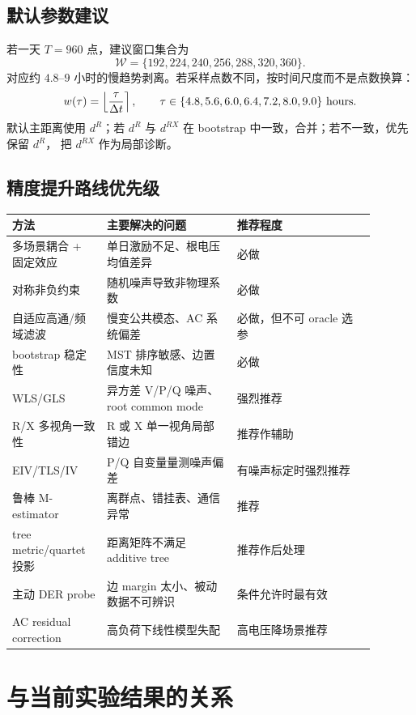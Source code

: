 \documentclass[UTF8,11pt]{ctexart}
\begin{document}
\subsection{默认参数建议}

若一天 $T=960$ 点，建议窗口集合为
\[
    \mathcal{W}=\{192,224,240,256,288,320,360\}.
\]
对应约 $4.8$--$9$ 小时的慢趋势剥离。若采样点数不同，按时间尺度而不是点数换算：
\[
    w(\tau)=\left\lfloor\frac{\tau}{\Delta t}\right\rceil,\qquad
    \tau\in\{4.8,5.6,6.0,6.4,7.2,8.0,9.0\}\ {\rm hours}.
\]
默认主距离使用 $d^R$；若 $d^R$ 与 $d^{RX}$ 在 bootstrap 中一致，合并；若不一致，优先保留 $d^R$，
把 $d^{RX}$ 作为局部诊断。

\subsection{精度提升路线优先级}

\begin{longtable}{p{0.23\linewidth}p{0.32\linewidth}p{0.34\linewidth}}
\toprule
方法 & 主要解决的问题 & 推荐程度 \\
\midrule
多场景耦合 + 固定效应 & 单日激励不足、根电压均值差异 & 必做 \\
对称非负约束 & 随机噪声导致非物理系数 & 必做 \\
自适应高通/频域滤波 & 慢变公共模态、AC 系统偏差 & 必做，但不可 oracle 选参 \\
bootstrap 稳定性 & MST 排序敏感、边置信度未知 & 必做 \\
WLS/GLS & 异方差 V/P/Q 噪声、root common mode & 强烈推荐 \\
R/X 多视角一致性 & R 或 X 单一视角局部错边 & 推荐作辅助 \\
EIV/TLS/IV & P/Q 自变量量测噪声偏差 & 有噪声标定时强烈推荐 \\
鲁棒 M-estimator & 离群点、错挂表、通信异常 & 推荐 \\
tree metric/quartet 投影 & 距离矩阵不满足 additive tree & 推荐作后处理 \\
主动 DER probe & 边 margin 太小、被动数据不可辨识 & 条件允许时最有效 \\
AC residual correction & 高负荷下线性模型失配 & 高电压降场景推荐 \\
\bottomrule
\end{longtable}

\section{与当前实验结果的关系}
\end{document}
